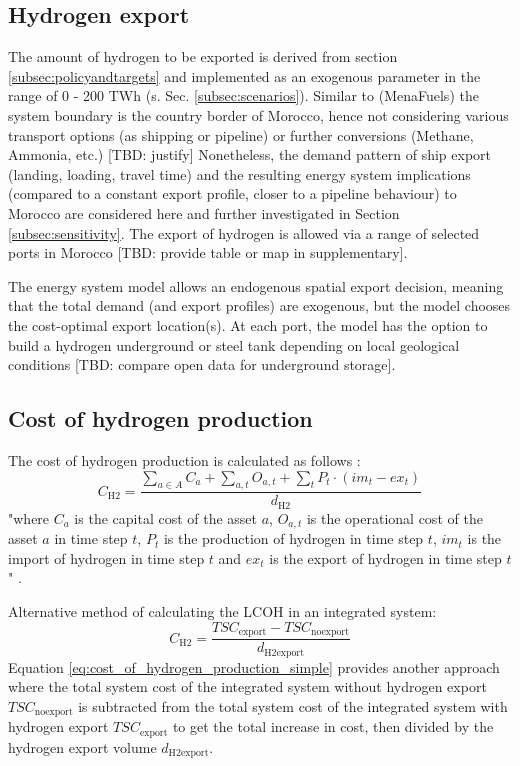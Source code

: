 \subsection{Hydrogen export}
\label{subsec:hydrogen_export}
The amount of hydrogen to be exported is derived from section \ref{subsec:policyandtargets} and implemented as an exogenous parameter in the range of 0 - 200 TWh (s. Sec. \ref{subsec:scenarios}). Similar to (MenaFuels) \cite{Ersoy2022} the system boundary is the country border of Morocco, hence not considering various transport options (as shipping or pipeline) or further conversions (Methane, Ammonia, etc.) [TBD: justify]
Nonetheless, the demand pattern of ship export (landing, loading, travel time) and the resulting energy system implications (compared to a constant export profile, closer to a pipeline behaviour) to Morocco are considered here and further investigated in Section \ref{subsec:sensitivity}.
The export of hydrogen is allowed via a range of selected ports in Morocco [TBD: provide table or map in supplementary]. 

The energy system model allows an endogenous spatial export decision, meaning that the total demand (and export profiles) are exogenous, but the model chooses the  cost-optimal export location(s). At each port, the model has the option to build a hydrogen underground or steel tank depending on local geological conditions [TBD: compare open data for underground storage].


\subsection{Cost of hydrogen production}
\label{subsec:cost_of_hydrogen_production}

The cost of hydrogen production is calculated as follows \cite{Zeyen2022}:
\begin{equation}
    \label{eq:cost_of_hydrogen_production}
    C_\mathrm{H2}= \frac{\sum \limits_{a\in A}^{} C_a + \sum \limits_{a,t} O_{a,t} + \sum \limits_{t} P_t \cdot (im_t - ex_t)   }{d_\mathrm{H2}}
\end{equation}
"where $C_a$ is the capital cost of the asset $a$, $O_{a,t}$ is the operational cost of the asset $a$ in time step $t$, $P_t$ is the production of hydrogen in time step $t$, $im_t$ is the import of hydrogen in time step $t$ and $ex_t$ is the export of hydrogen in time step $t$" \cite{Zeyen2022}.


Alternative method of calculating the LCOH in an integrated system:
\begin{equation}
    \label{eq:cost_of_hydrogen_production_simple}
    C_\mathrm{H2}=\frac{TSC_\mathrm{export}-TSC_\mathrm{noexport}}{d_\mathrm{H2export}}
\end{equation}
Equation \ref{eq:cost_of_hydrogen_production_simple} provides another approach where the total system cost of the integrated system without hydrogen export $TSC_\mathrm{noexport}$ is subtracted from the total system cost of the integrated system with hydrogen export $TSC_\mathrm{export}$ to get the total increase in cost, then divided by the hydrogen export volume $d_\mathrm{H2export}$.

